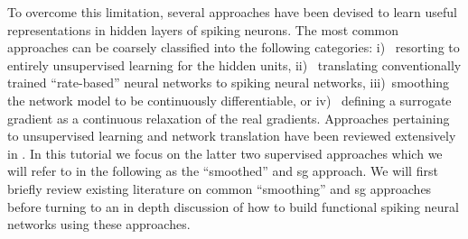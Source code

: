 \documentclass[journal,onecolumn,11pt]{IEEEtran}
\begin{document}
To overcome this limitation, several approaches have been devised to learn useful representations in hidden layers of spiking neurons.
The most common approaches can be coarsely classified into the following categories: 
i)  ~resorting to entirely unsupervised learning for the hidden units, 
ii) ~translating conventionally trained ``rate-based'' neural networks to spiking neural networks,
iii)~smoothing the network model to be continuously differentiable, or 
iv) ~defining a surrogate gradient as a continuous relaxation of the real
gradients.  
Approaches pertaining to unsupervised learning and network translation have been reviewed extensively in \cite{tavanaei_deep_2018}. 
In this tutorial we focus on the latter two supervised approaches which we will refer to in the following as the ``smoothed'' and \gls{sg} approach.
We will first briefly review existing literature on common ``smoothing'' and \gls{sg} approaches before turning to an in depth discussion of how to build functional spiking neural networks using these approaches. 
%
%
%
%
%
\end{document}
